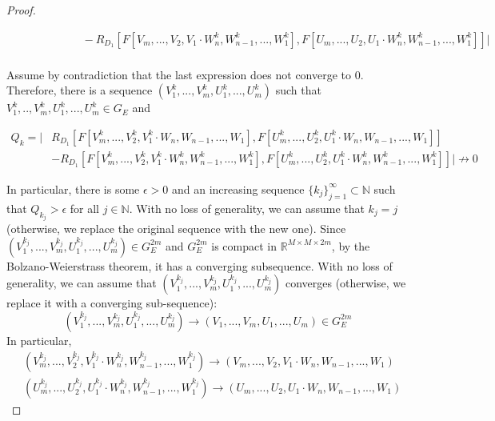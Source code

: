\documentclass{article} %
\begin{document}
\begin{proof}
\begin{small}
\begin{equation}
\begin{aligned}
&\;\;\;\;\;\;\;\;\;\;\;\;\;\;\;\;\;\;\;\; - R_{D_1}\left [F[V_m,...,V_2,V_1\cdot W^k_{n},W^k_{n-1},...,W^k_1], F[U_m,...,U_2,U_1\cdot W^k_{n},W^k_{n-1},...,W^k_1 ] \right] \Big\vert \\
\end{aligned}
\end{equation}
\end{small}
Assume by contradiction that the last expression does not converge to $0$. Therefore, there is a sequence $(V^k_1,...,V^k_m,U^k_1,...,U^k_m)$ such that $V^k_1,..,V^k_m,U^k_1,...,U^k_m \in G_{E}$ and
\begin{small}
\begin{equation}
\begin{aligned}
Q_k = \Big\vert &R_{D_1}\left[ F[V^k_m,...,V^k_2,V^k_1\cdot W_{n},W_{n-1},...,W_1]
,F[U^k_m,...,U^k_2,U^k_1\cdot W_{n},W_{n-1},...,W_1 ] \right] \\
& - R_{D_1}\left[F[V^k_m,...,V^k_2,V^k_1\cdot W^k_{n},W^k_{n-1},...,W^k_1], F[U^k_m,...,U^k_2,U^k_1\cdot W^k_{n},W^k_{n-1},...,W^k_1] \right] \Big\vert \not\to 0
\end{aligned}
\end{equation}
\end{small}
In particular, there is some $\epsilon>0$ and an increasing sequence $\{k_j\}^{\infty}_{j=1} \subset \mathbb{N}$ such that $Q_{k_j} > \epsilon$ for all $j \in \mathbb{N}$. With no loss of generality, we can assume that $k_j = j$ (otherwise, we replace the original sequence with the new one). Since $(V^{k_j}_1,...,V^{k_j}_m,U^{k_j}_1,...,U^{k_j}_m) \in G^{2m}_E$ and $G^{2m}_E$ is compact in $\mathbb{R}^{M\times M \times 2m}$, by the Bolzano-Weierstrass theorem, it has a converging subsequence. With no loss of generality, we can assume that $(V^{k_j}_1,...,V^{k_j}_m,U^{k_j}_1,...,U^{k_j}_m)$ converges (otherwise, we replace it with a converging sub-sequence):
\begin{equation}
(V^{k_j}_1,...,V^{k_j}_m,U^{k_j}_1,...,U^{k_j}_m) \to (V_1,...,V_m,U_1,...,U_m) \in G^{2m}_E
\end{equation}
In particular,  
\begin{equation}
\begin{aligned}
&(V^{k_j}_m,...,V^{k_j}_2,V^{k_j}_1\cdot W^{k_j}_{n},W^{k_j}_{n-1},...,W^{k_j}_1) \to (V_m,...,V_2,V_1\cdot W_n,W_{n-1},...,W_1)\\
&(U^{k_j}_m,...,U^{k_j}_{2},U^{k_j}_1\cdot W^{k_j}_{n},W^{k_j}_{n-1},...,W^{k_j}_1) \to (U_m,...,U_2,U_1\cdot W_n,W_{n-1},...,W_1)
\end{aligned}

\end{equation}
\end{proof}
\end{document}

